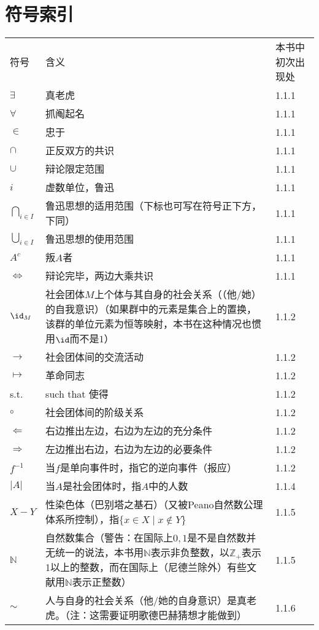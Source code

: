 \chapter*{符号索引}
\begin{longtable}{lp{.6\linewidth}l}
	符号 & 含义 & 本书中初次出现处 \\
	$\exists$ & 真老虎 & 1.1.1\\
	$\forall$ & 抓阄起名 & 1.1.1\\
	$\in$ & 忠于 & 1.1.1\\
	$\cap$ & 正反双方的共识 & 1.1.1\\
	$\cup$ & 辩论限定范围 & 1.1.1\\
	$i$ & 虚数单位，鲁迅 & 1.1.1\\
	$\bigcap_{i\in I}$ & 鲁迅思想的适用范围（下标也可写在符号正下方，下同） & 1.1.1\\
	$\bigcup_{i \in I}$ & 鲁迅思想的使用范围 & 1.1.1\\
	$A^c$ & 叛$A$者 & 1.1.1\\
	$\Leftrightarrow$ & 辩论完毕，两边大乘共识 & 1.1.1\\
	$\id_M$ & 社会团体$M$上个体与其自身的社会关系（（他/她）的自我意识）（如果群中的元素是集合上的置换，该群的单位元素为恒等映射，本书在这种情况也惯用$\id$而不是$1$）& 1.1.2\\
	$\rightarrow$ & 社会团体间的交流活动 & 1.1.2\\
	$\mapsto$ & 革命同志 & 1.1.2\\
	s.t. & such that 使得 & 1.1.2\\
	$\circ$ & 社会团体间的阶级关系 & 1.1.2\\
	$\Leftarrow$ & 右边推出左边，右边为左边的充分条件 & 1.1.2\\
	$\Rightarrow$ & 左边推出右边，右边为左边的必要条件 & 1.1.2\\
	$f^{-1}$ & 当$f$是单向事件时，指它的逆向事件（报应） & 1.1.2\\
	$|A|$ & 当$A$是社会团体时，指$A$中的人数 & 1.1.4\\
	$X-Y$ & 性染色体（巴别塔之基石）（又被Peano自然数公理体系所控制），指$\{x\in X\mid x\notin Y\}$ & 1.1.5\\
	$\mathbb{N}$ & 自然数集合（警告：在国际上$0,1$是不是自然数并无统一的说法，本书用$\mathbb{N}$表示非负整数，以$\mathbb{Z}_+$表示1以上的整数，而在国际上（尼德兰除外）有些文献用$\mathbb{N}$表示正整数）& 1.1.5\\
	$\sim$ & 人与自身的社会关系（他/她的自身意识）是真老虎。（注：这需要证明歌德巴赫猜想才能做到） & 1.1.6\\

\end{longtable}
